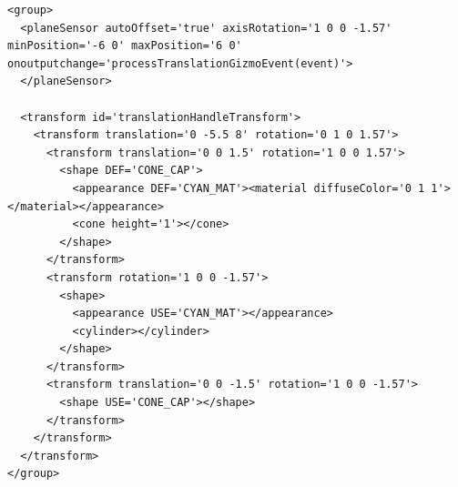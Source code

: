 \begin{verbatim}
<group>
  <planeSensor autoOffset='true' axisRotation='1 0 0 -1.57' minPosition='-6 0' maxPosition='6 0' onoutputchange='processTranslationGizmoEvent(event)'>
  </planeSensor>

  <transform id='translationHandleTransform'>
    <transform translation='0 -5.5 8' rotation='0 1 0 1.57'>
      <transform translation='0 0 1.5' rotation='1 0 0 1.57'>
        <shape DEF='CONE_CAP'>
          <appearance DEF='CYAN_MAT'><material diffuseColor='0 1 1'></material></appearance>
          <cone height='1'></cone>
        </shape>
      </transform>
      <transform rotation='1 0 0 -1.57'>
        <shape>
          <appearance USE='CYAN_MAT'></appearance>
          <cylinder></cylinder>
        </shape>
      </transform>
      <transform translation='0 0 -1.5' rotation='1 0 0 -1.57'>
        <shape USE='CONE_CAP'></shape>
      </transform>
    </transform>
  </transform>
</group>
\end{verbatim}

